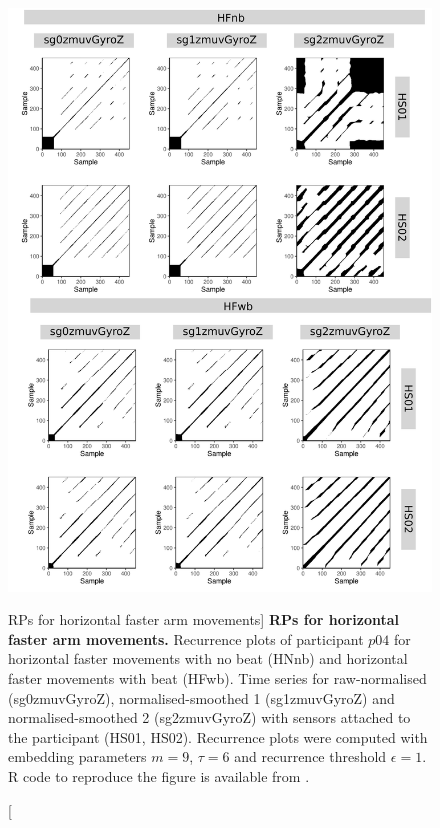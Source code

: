 



\begin{figure}
\centering
\includegraphics[height=0.8\textheight]{rps_HF_w500_p04}
\caption
	[RPs for horizontal faster arm movements]{
	{\bf RPs for horizontal faster arm movements.}	
	Recurrence plots of participant $p04$ for 
	horizontal faster movements with no beat (HNnb) and
	horizontal faster movements with beat (HFwb).
	Time series for raw-normalised (sg0zmuvGyroZ), 
	normalised-smoothed 1 (sg1zmuvGyroZ) and 
	normalised-smoothed 2 (sg2zmuvGyroZ) with
	sensors attached to the participant (HS01, HS02).
	Recurrence plots were computed with 
	embedding parameters $m=9$, $\tau=6$ and 
	recurrence threshold $\epsilon=1$.
	R code to reproduce the figure is available from \cite{hwum2018}.
        }
    \label{fig:rps_HF_w500_p04}
\end{figure}





